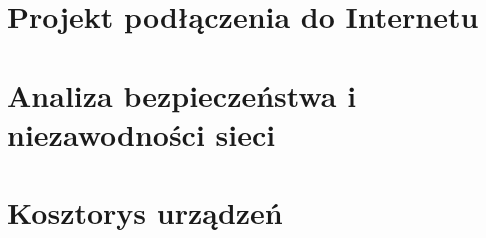 \documentclass{report}
\begin{document}
\section{Projekt podłączenia do Internetu}
\section{Analiza bezpieczeństwa i niezawodności sieci}
\section{Kosztorys urządzeń}



\end{document}
